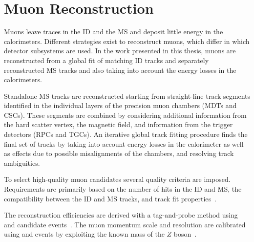 \section{Muon Reconstruction}
Muons leave traces in the ID and the MS and deposit little energy in the calorimeters. 
Different strategies exist to reconstruct muons, which differ in which detector subsystems are used.
In the work presented in this thesis, muons are reconstructed from a global fit of matching ID tracks and separately reconstructed MS tracks and also taking into account the energy losses in the calorimeters. 

Standalone MS tracks are reconstructed starting from straight-line track segments identified in the individual layers of the precision muon chambers (MDTs and CSCs). 
These segments are combined by considering additional information from the hard scatter vertex, the magnetic field, and information from the trigger detectors (RPCs and TGCs). An iterative global track fitting procedure finds the final set of tracks by taking into account energy losses in the calorimeter as well as effects due to possible misalignments of the chambers, and resolving track ambiguities. \cite{MUON-2018-03}

To select high-quality muon candidates several quality criteria are imposed. 
Requirements are primarily based on the number of hits in the ID and MS, the compatibility between the ID and MS tracks, and track fit properties~\cite{MUON-2018-03}.

The reconstruction efficiencies are derived with a tag-and-probe method using \Jpsimumu and \Zmumu candidate events~\cite{MUON-2018-03}. 
The muon momentum scale and resolution are calibrated using \Jpsimumu and \Zmumu events by exploiting the known mass of the $Z$ boson~\cite{PERF-2015-10}. 





